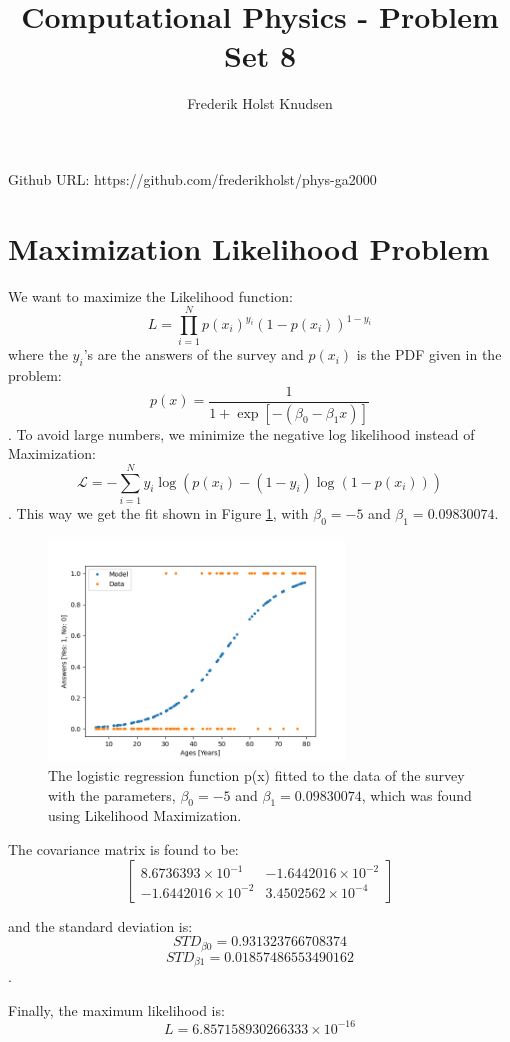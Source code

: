 \documentclass[11pt]{article}
\title{Computational Physics -  Problem Set 8}
\author{Frederik Holst Knudsen}
\begin{document}
\maketitle
Github URL: https://github.com/frederikholst/phys-ga2000
\section{Maximization Likelihood Problem}
We want to maximize the Likelihood function:
$$L=\prod_{i=1}^{N} p(x_i)^{y_i}(1-p(x_i))^{1-y_i}$$
where the $y_i$'s are the answers of the survey and $p(x_i)$ is the PDF given in the problem:
$$p(x)=\frac{1}{1+\exp [-(\beta_0-\beta_1 x)]}$$.
To avoid large numbers, we minimize the negative log likelihood instead of Maximization:
$$\mathcal{L}=-\sum_{i=1}^{N}y_i \log (p(x_i)-(1-y_i)\log (1-p(x_i))) $$.
This way we get the fit shown in Figure \ref{fit}, with $\beta_0=-5$ and $\beta_1=0.09830074$. 
\begin{figure}[!htbp]
    \centering
    \includegraphics[width=0.7\textwidth]{fit.png}
    \caption{The logistic regression function p(x) fitted to the data of the survey with the parameters, $\beta_0=-5$ and $\beta_1=0.09830074$, which was found using Likelihood Maximization.   }
    \label{fit}
\end{figure}


The covariance matrix is found to be:
\[
\begin{bmatrix}
8.6736393 \times 10^{-1} & -1.6442016 \times 10^{-2} \\
-1.6442016 \times 10^{-2} & 3.4502562 \times 10^{-4}
\end{bmatrix}
\]

and the standard deviation is: 
$$STD_{\beta 0}= 0.931323766708374$$
$$STD_{\beta 1}= 0.01857486553490162$$.

Finally, the maximum likelihood is: 
$$ L=6.857158930266333 \times 10^{-16}$$
\end{document}
